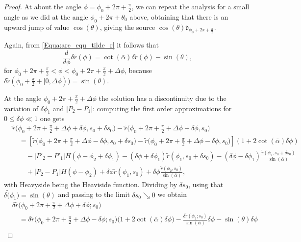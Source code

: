 \documentclass[reqno]{amsart}
\theoremstyle{definition} \newtheorem{definition}{Definition}[section]
\theoremstyle{definition} \newtheorem{remark}[definition]{Remark}
\theoremstyle{plain} \newtheorem{lemma}[definition]{Lemma}
\theoremstyle{plain} \newtheorem{proposition}[definition]{Proposition}
\theoremstyle{plain} \newtheorem{theorem}[definition]{Theorem}
\theoremstyle{plain} \newtheorem{corollary}[definition]{Corollary}
\theoremstyle{definition} \newtheorem{example}[definition]{Example}
\theoremstyle{plain} \newtheorem{claim}[clai]{Claim}
\theoremstyle{definition} \newtheorem{assumption}[definition]{Assumption}
\theoremstyle{definition} \newtheorem{observation}[definition]{Observation}
\newcommand{\1}{\mathbbm 1}
\newcommand{\Diracd}{\mathfrak{d}}
\numberwithin{equation}{section} %
\theoremstyle{plain} \newtheorem*{theorem*}{Theorem}
\theoremstyle{plain} \newtheorem{mthm}[maintheorem]{Main Theorem}
\theoremstyle{plain} \newtheorem*{mthm*}{Main Theorem}
\theoremstyle{plain} \newtheorem*{conjecture*}{Conjecture}
\theoremstyle{plain} \newtheorem{conjecture}[definition]{Conjecture}
\theoremstyle{plain} \newtheorem*{problem*}{Problem}
\begin{document}
\begin{proof}
At about the angle $\phi = \phi_0 + 2\pi + \frac{\pi}{2}$, we can repeat the analysis for a small angle as we did at the angle $\phi_0 + 2\pi + \theta_0$ above,  obtaining that
there is an upward jump of value $\cos(\theta)$, giving the source $\cos(\theta) \Diracd_{\phi_0 + 2\pi + \frac{\pi}{2}}$.

Again, from \eqref{Equa:arc_equ_tilde_r} it follows that
\begin{equation*}
\frac{d}{d\phi} \delta \tilde r(\phi) = \cot(\bar \alpha) \delta \tilde r(\phi) - \sin(\theta),
\end{equation*}
for $\phi_0 + 2\pi + \frac{\pi}{2} < \phi < \phi_0 + 2\pi + \frac{\pi}{2}+\Delta\phi$, because $\delta \tilde r(\phi_0 + \frac{\pi}{2} + [0,\Delta \phi)) = \sin(\theta)$.

At the angle $\phi_0 + 2\pi + \frac{\pi}{2} + \Delta \phi$ the solution has a discontinuity due to the variation of $\delta \phi_1$ and $|P_2 - P_1|$: computing the first order approximations for $0 \leq \delta \phi \ll 1$ one gets
\begin{align*}
&\tilde r \bigg( \phi_0 + 2\pi + \frac{\pi}{2} + \Delta \phi + \delta \phi, s_0 + \delta s_0 \bigg) - \tilde r \bigg( \phi_0 + 2\pi + \frac{\pi}{2} + \Delta\phi +\delta \phi,s_0 \bigg) \\
& \quad = \left[ \tilde r \bigg( \phi_0 + 2\pi + \frac{\pi}{2} + \Delta \phi - \delta \phi, s_0 + \delta s_0 \bigg) - \tilde r \bigg( \phi_0 + 2\pi + \frac{\pi}{2} + \Delta \phi - \delta \phi,s_0 \bigg) \right] (1 + 2 \cot(\bar \alpha) \delta \phi) \\
& \quad \quad - |P'_2 - P'_1| H(\phi - \phi_2 + \delta \phi_1) - (\delta \phi + \delta \phi_1) \tilde r(\phi_1,s_0 + \delta s_0) - (\delta \phi - \delta \phi_1) \frac{\tilde r(\phi_2,s_0 + \delta s_0)}{\sin(\bar \alpha)} \\
& \quad \quad + |P_2 - P_1| H(\phi - \phi_2) + \delta \phi \tilde r(\phi_1,s_0) + \delta \phi \frac{\tilde r(\phi_2,s_0)}{\sin(\bar \alpha)},
\end{align*}
with \gls{Heavyside} being the Heaviside function. Dividing by $\delta s_0$, using that $\delta \tilde(\phi_1) = \sin(\theta)$ and passing to the limit $\delta s_0 \searrow 0$ we obtain
\begin{align*}
&\delta \tilde r \bigg( \phi_0 + 2\pi + \frac{\pi}{2} + \Delta \phi + \delta \phi;s_0 \bigg) \\
& \quad = \delta \tilde r \bigg( \phi_0 + 2\pi + \frac{\pi}{2} + \Delta \phi - \delta \phi;s_0 \bigg) \big( 1 + 2 \cot(\bar \alpha) \delta \phi \big) - \frac{\delta \tilde r(\phi_2;s_0)}{\sin(\bar \alpha)} \delta \phi - \sin(\theta) \delta \phi \\

\end{align*}
\end{proof}
\end{document}
